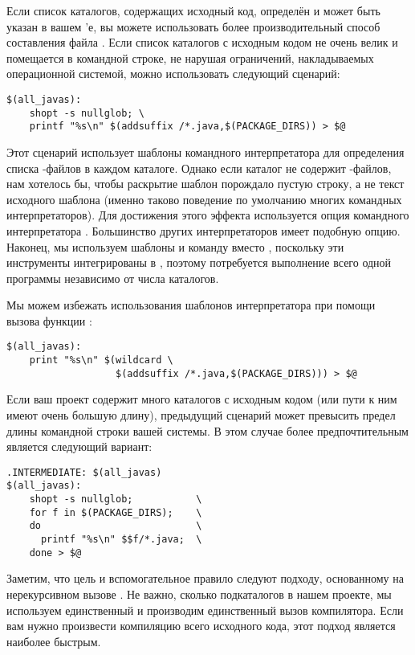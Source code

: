 Если список каталогов, содержащих исходный код, определён и может быть
указан в вашем \Makefile{}'е, вы можете использовать более
производительный способ составления файла .
Если список каталогов с исходным кодом не очень велик и помещается в
командной строке, не нарушая ограничений, накладываемых операционной
системой, можно использовать следующий сценарий:

{\footnotesize
\begin{verbatim}
$(all_javas):
    shopt -s nullglob; \
    printf "%s\n" $(addsuffix /*.java,$(PACKAGE_DIRS)) > $@
\end{verbatim}
}

Этот сценарий использует шаблоны командного интерпретатора для
определения списка \Java{}\hyp{}файлов в каждом каталоге. Однако если
каталог не содержит \Java{}\hyp{}файлов, нам хотелось бы, чтобы
раскрытие шаблон порождало пустую строку, а не текст исходного шаблона
(именно таково поведение по умолчанию многих командных
интерпретаторов). Для достижения этого эффекта используется опция
командного интерпретатора \utility{bash} .
Большинство других интерпретаторов имеет подобную опцию. Наконец, мы
используем шаблоны и команду \command{printf} вместо \command{ln -l},
поскольку эти инструменты интегрированы в \utility{bash}, поэтому
потребуется выполнение всего одной программы независимо от числа
каталогов.

Мы можем избежать использования шаблонов интерпретатора при помощи
вызова функции \function{wildcard}:

{\footnotesize
\begin{verbatim}
$(all_javas):
    print "%s\n" $(wildcard \
                   $(addsuffix /*.java,$(PACKAGE_DIRS))) > $@
\end{verbatim}
}

Если ваш проект содержит много каталогов с исходным кодом (или пути к
ним имеют очень большую длину), предыдущий сценарий может превысить
предел длины командной строки вашей системы. В этом случае более
предпочтительным является следующий вариант:

{\footnotesize
\begin{verbatim}
.INTERMEDIATE: $(all_javas)
$(all_javas):
    shopt -s nullglob;           \
    for f in $(PACKAGE_DIRS);    \
    do                           \
      printf "%s\n" $$f/*.java;  \
    done > $@

\end{verbatim}
}

Заметим, что цель  и вспомогательное правило следуют
подходу, основанному на нерекурсивном вызове \GNUmake{}. Не важно,
сколько подкаталогов в нашем проекте, мы используем единственный
\Makefile{} и производим единственный вызов компилятора. Если вам
нужно произвести компиляцию всего исходного кода, этот подход является
наиболее быстрым.

